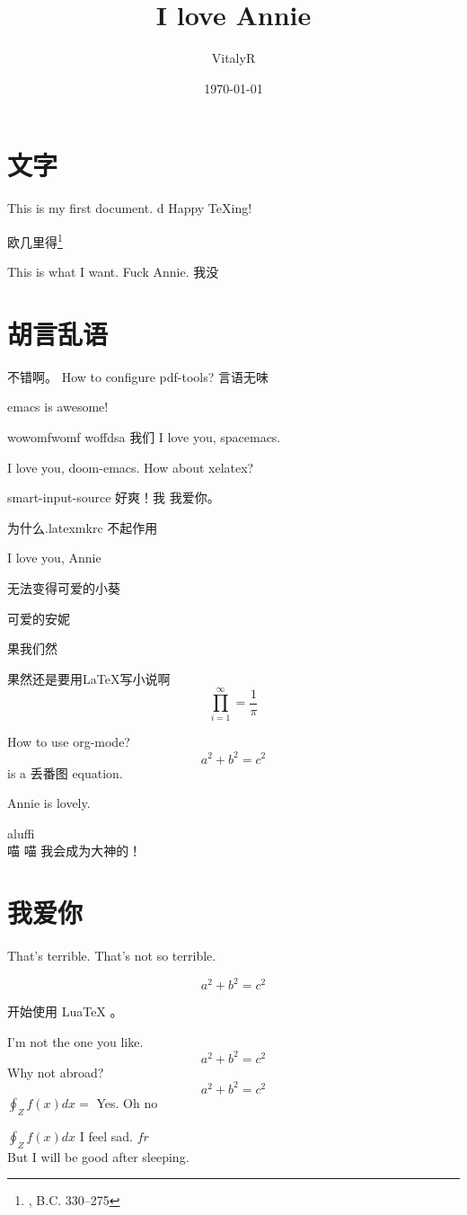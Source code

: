 \documentclass[UTF8]{ctexart}
\title{I love Annie}
\author{VitalyR}
\date{\today}
\begin{document}
\maketitle
\tableofcontents

\section{文字}
This is my first document.
d
Happy \TeX ing!

欧几里得\footnote{, B.C. 330--275}

This is what I want.
Fuck Annie.
我没

\section{胡言乱语}

不错啊。
How to configure pdf-tools?
言语无味

emacs is awesome!

wowomfwomf woffdsa
我们
I love you, spacemacs.

I love you, doom-emacs.
How about xelatex?


smart-input-source 好爽！我
我爱你。

为什么.latexmkrc 不起作用

I love you, Annie

无法变得可爱的小葵

可爱的安妮

果我们然

果然还是要用\LaTeX 写小说啊
\begin{equation}
	\prod_{i=1}^{\infty}=\frac{1}{\pi}
\end{equation}

How to use org-mode?
\[a^{2}+b^{2}=c^{2}\] is a 丢番图 equation.

Annie is lovely.

aluffi \\
喵
喵
我会成为大神的！

\section{我爱你}

That's terrible.
That's not so terrible.



\begin{equation}
	\label{eq:2}
	a^{2}+b^{2}=c^{2}
\end{equation}

开始使用 LuaTeX 。

I'm not the one you like.
\[a^{2}+b^{2}=c^{2}\]
Why not abroad?
\[a^{2}+b^{2}=c^{2}\] \(\oint_{Z}f(x)dx = \) Yes.
Oh
no

\(\oint_{Z}f(x)dx\)
I feel sad.
\(fr\)
\[\]
But I will be good after sleeping.
\end{document}
